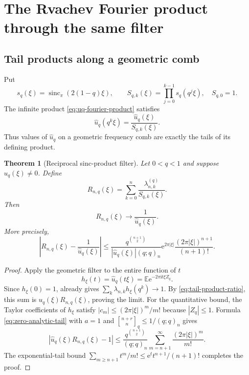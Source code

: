 \documentclass[11pt,a4paper,oneside]{article}
\newtheorem{theorem}{Theorem}[section]
\theoremstyle{definition}
\theoremstyle{remark}
\newcommand{\E}{\mathbb E}
\newcommand{\e}{\mathrm e}
\newcommand{\ii}{\mathrm i}
\newcommand{\sincpi}{\operatorname{sinc}_{\pi}}
\newcommand{\abs}[1]{\left\lvert#1\right\rvert}
\newcommand{\qbinom}[3]{\genfrac{[}{]}{0pt}{}{#1}{#2}_{#3}}
\begin{document}
\section{The Rvachev Fourier product through the same filter}
\label{sec:rvachev-filter}

\subsection{Tail products along a geometric comb}

Put
\begin{equation}
 s_q(\xi)=\sincpi(2(1-q)\xi),
 \qquad
 S_{q,k}(\xi)=\prod_{j=0}^{k-1}s_q(q^j\xi),
 \quad S_{q,0}=1.
 \label{eq:prefix-products}
\end{equation}
The infinite product \eqref{eq:uq-fourier-product} satisfies
\begin{equation}
 \widehat u_q(q^k\xi)
 =\frac{\widehat u_q(\xi)}{S_{q,k}(\xi)}.
 \label{eq:tail-product-ratio}
\end{equation}
Thus values of $\widehat u_q$ on a geometric frequency comb are exactly the
tails of its defining product.

\begin{theorem}[Reciprocal sinc-product filter]
\label{thm:reciprocal-product}
Let $0<q<1$ and suppose $\widehat u_q(\xi)\ne0$.  Define
\begin{equation}
 R_{n,q}(\xi)=\sum_{k=0}^n
 \frac{\lambda_{n,k}^{(q)}}{S_{q,k}(\xi)}.
 \label{eq:reciprocal-approximant}
\end{equation}
Then
\begin{equation}
 R_{n,q}(\xi)\longrightarrow\frac1{\widehat u_q(\xi)}.
 \label{eq:reciprocal-limit}
\end{equation}
More precisely,
\begin{equation}
 \abs{R_{n,q}(\xi)-\frac1{\widehat u_q(\xi)}}
 \le
 \frac{q^{\binom{n+1}{2}}}{|\widehat u_q(\xi)|(q;q)_n}
 \e^{2\pi|\xi|}\frac{(2\pi|\xi|)^{n+1}}{(n+1)!}.
 \label{eq:reciprocal-error-bound}
\end{equation}
\end{theorem}

\begin{proof}
Apply the geometric filter to the entire function of $t$
\[
 h_\xi(t)=\widehat u_q(t\xi)=\E\e^{-2\pi\ii t\xi Z_q}.
\]
Since $h_\xi(0)=1$,  already gives
$\sum_k\lambda_{n,k}h_\xi(q^k)\to1$.  By
\eqref{eq:tail-product-ratio}, this sum is
$\widehat u_q(\xi)R_{n,q}(\xi)$, proving the limit.
For the quantitative bound, the Taylor coefficients of $h_\xi$ satisfy
$|c_m|\le(2\pi|\xi|)^m/m!$ because $|Z_q|\le1$.  Formula
\eqref{eq:zero-analytic-tail} with $a=1$ and
$\qbinom{n+r}{n}q\le1/(q;q)_n$ gives
\[
 |\widehat u_q(\xi)R_{n,q}(\xi)-1|
 \le\frac{q^{\binom{n+1}{2}}}{(q;q)_n}
 \sum_{m=n+1}^\infty\frac{(2\pi|\xi|)^m}{m!}.
\]
The exponential-tail bound
$\sum_{m\ge n+1}t^m/m!\le\e^t t^{n+1}/(n+1)!$ completes the proof.
\end{proof}
\end{document}
